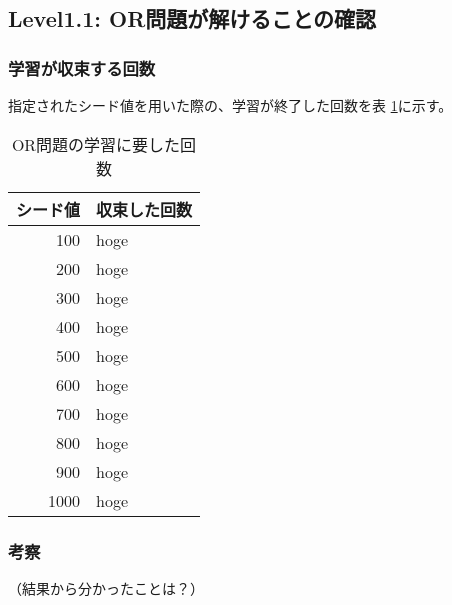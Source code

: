 \subsection{Level1.1: OR問題が解けることの確認}
\subsubsection{学習が収束する回数}
指定されたシード値を用いた際の、学習が終了した回数を表
\ref{table:level1.1}に示す。

\begin{table}[htb]
 \begin{center}
  \caption{OR問題の学習に要した回数}
  \label{table:level1.1}
  \begin{tabular}[htb]{r|l} \hline
   シード値 & 収束した回数 \\ \hline \hline
   100 & hoge \\ \hline
   200 & hoge \\ \hline
   300 & hoge \\ \hline
   400 & hoge \\ \hline
   500 & hoge \\ \hline
   600 & hoge \\ \hline
   700 & hoge \\ \hline
   800 & hoge \\ \hline
   900 & hoge \\ \hline
   1000 & hoge \\ \hline
  \end{tabular}
 \end{center}
\end{table}


\subsubsection{考察}
（結果から分かったことは？）

